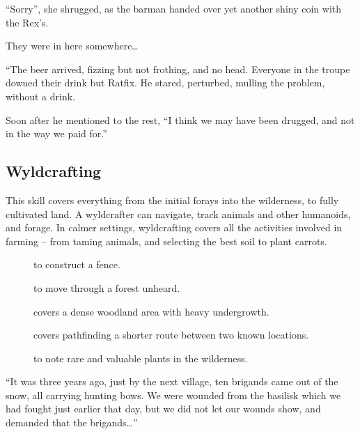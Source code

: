 \begin{multicols}{2}
\begin{exampletext}
  ``Sorry'',
  she shrugged, as the barman handed over yet another shiny coin with the Rex's.

  They were in here somewhere\ldots

\end{exampletext}

\else

\begin{exampletext}
  ``The beer arrived, fizzing but not frothing, and no head.
  Everyone in the troupe downed their drink but Ratfix.
  He stared, perturbed, mulling the problem, without a drink.

  Soon after he mentioned to the rest,
  ``I think we may have been drugged, and not in the way we paid for.''
\end{exampletext}
\fi

\subsection{Wyldcrafting}

This skill covers everything from the initial forays into the wilderness, to fully cultivated land.
A wyldcrafter can navigate, track animals and other humanoids, and forage.
In calmer settings, wyldcrafting covers all the activities involved in farming -- from taming animals, and selecting the best soil to plant carrots.


\begin{description}
  \item[]
    to construct a fence.
  \item[]
    to move through a forest unheard.
  \item[]
    covers a dense woodland area with heavy undergrowth.
  \item[]
    covers pathfinding a shorter route between two known locations.
  \item[]
    to note rare and valuable plants in the wilderness.
\end{description}

\begin{exampletext}
  ``It was three years ago, just by the next \gls{village}, ten brigands came out of the snow, all carrying hunting bows.
  We were wounded from the basilisk which we had fought just earlier that day, but we did not let our wounds show, and demanded that the brigands\ldots''


\end{exampletext}
\end{multicols}
